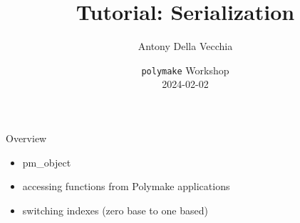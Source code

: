 \documentclass[9pt]{beamer}
\author[Antony Della Vecchia]{Antony Della Vecchia }
\title{Tutorial: Serialization}
\institute[]{
Technische Universit\"at Berlin
}
\date{
  \texttt{polymake} Workshop  \\
  2024-02-02
}
\theoremstyle{definition}
\begin{document}
\maketitle

\begin{frame}[fragile]{Overview}
  \begin{itemize}
  \item pm_object
  \item accessing functions from Polymake applications
  \item switching indexes (zero base to one based)
    
  \end{itemize}
\end{frame}

\end{document}
